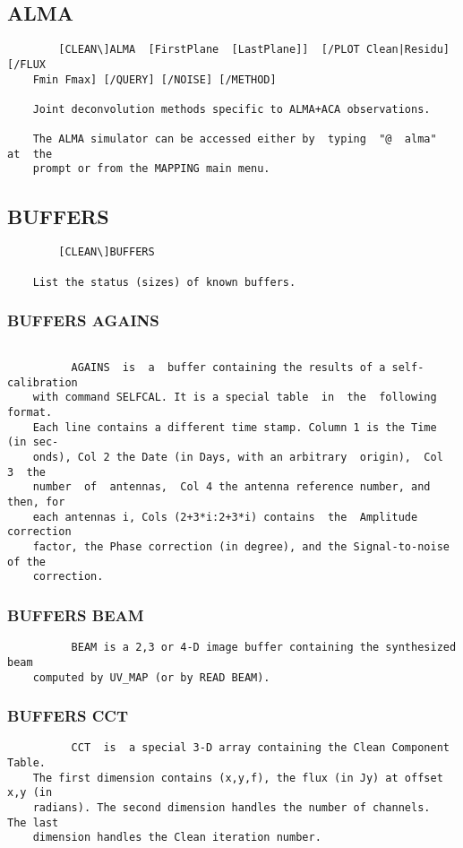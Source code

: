 \subsection{ALMA}
\begin{verbatim}
        [CLEAN\]ALMA  [FirstPlane  [LastPlane]]  [/PLOT Clean|Residu] [/FLUX
    Fmin Fmax] [/QUERY] [/NOISE] [/METHOD]

    Joint deconvolution methods specific to ALMA+ACA observations.

    The ALMA simulator can be accessed either by  typing  "@  alma"  at  the
    prompt or from the MAPPING main menu.

\end{verbatim}
\subsection{BUFFERS}
\begin{verbatim}
        [CLEAN\]BUFFERS

    List the status (sizes) of known buffers.
\end{verbatim}
\subsubsection{BUFFERS AGAINS}
\begin{verbatim}

          AGAINS  is  a  buffer containing the results of a self-calibration
    with command SELFCAL. It is a special table  in  the  following  format.
    Each line contains a different time stamp. Column 1 is the Time (in sec-
    onds), Col 2 the Date (in Days, with an arbitrary  origin),  Col  3  the
    number  of  antennas,  Col 4 the antenna reference number, and then, for
    each antennas i, Cols (2+3*i:2+3*i) contains  the  Amplitude  correction
    factor, the Phase correction (in degree), and the Signal-to-noise of the
    correction.

\end{verbatim}
\subsubsection{BUFFERS BEAM}
\begin{verbatim}
          BEAM is a 2,3 or 4-D image buffer containing the synthesized  beam
    computed by UV_MAP (or by READ BEAM).

\end{verbatim}
\subsubsection{BUFFERS CCT}
\begin{verbatim}
          CCT  is  a special 3-D array containing the Clean Component Table.
    The first dimension contains (x,y,f), the flux (in Jy) at offset x,y (in
    radians). The second dimension handles the number of channels.  The last
    dimension handles the Clean iteration number.

\end{verbatim}
